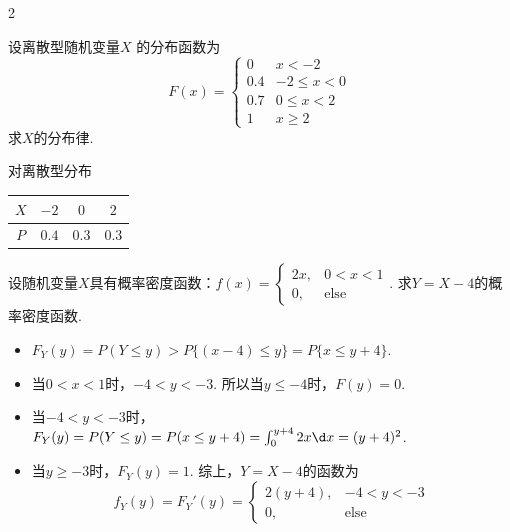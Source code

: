 \begin{paracol}{2}
\begin{problem}
    设离散型随机变量$X$ 的分布函数为
    \[F(x)=\begin{cases}
        0 & x<-2\\
        0.4 & -2\leq x<0\\
        0.7 & 0\leq x<2\\
        1 & x\geq 2
    \end{cases}\]
    求$X$的分布律.
\end{problem}
\switchcolumn
{}
\begin{solution}
    对离散型分布
    \begin{table}[H]
        \centering
        \begin{tabular}{cccc}
            \toprule
            $X$  & $-2$ & $0$ & $2$\\
            \midrule
            $P$ & $0.4$ & $0.3$ & $0.3$\\
            \bottomrule
        \end{tabular}
    \end{table}
\end{solution}
\end{paracol}

\begin{problem}
    设随机变量$X$具有概率密度函数：$f(x)=\begin{cases}
        2x, & 0<x<1\\
        0,  & \text{else}
    \end{cases}$. 求$Y=X-4$的概率密度函数.
\end{problem}
\begin{solution}\leavevmode
    \begin{itemize}
        \item $F_Y(y)=P(Y\leq y)>P\{(x-4)\leq y\}=P\{x\leq y+4\}$.
        \item 当$0<x<1$时，$-4<y<-3$. 所以当$y\leq-4$时，$F(y)=0$.
        \item 当$-4<y<-3$时，$F_Y(y)=P(Y\leq y)=P(x\leq y+4)=\int_0^{y+4}2x\d x=(y+4)^2$.
        \item 当$y\geq-3$时，$F_Y(y)=1$. 综上，$Y=X-4$的函数为
        \[f_Y(y)=F_Y'(y)=\begin{cases}
            2(y+4), & -4<y<-3\\0, & \text{else}
        \end{cases}\]
    \end{itemize}
\end{solution}

